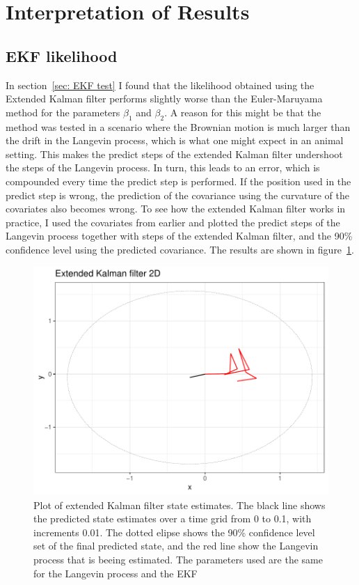 

\section{Interpretation of Results}
\subsection{EKF likelihood}
 In section~\ref{sec: EKF test} I found that the likelihood obtained using the Extended Kalman filter performs slightly worse than the Euler-Maruyama method for the parameters $\beta_1$ and $\beta_2$. A reason for this might be that the method was tested in a scenario where the Brownian motion is much larger than the drift in the Langevin process, which is what one might expect in an animal setting. This makes the predict steps of the extended Kalman filter undershoot the steps of the Langevin process. In turn, this leads to an error, which is compounded every time the predict step is performed. If the position used in the predict step is wrong, the prediction of the covariance using the curvature of the covariates also becomes wrong. To see how the extended Kalman filter works in practice, I used the covariates from earlier and plotted the predict steps of the Langevin process together with steps of the extended Kalman filter, and the 90\% confidence level using the predicted covariance. The results are shown in figure~\ref{fig:EKF high diffusion}. 


\begin{figure}[H]
    \centering
    \includegraphics[width=\linewidth]{Images/discussion/EKF high diffusion path.pdf}
    \caption[Extended Kalman filter path]{Plot of extended Kalman filter state estimates. The black line shows the predicted state estimates over a time grid from 0 to 0.1, with increments 0.01. The dotted elipse shows the 90\% confidence level set of the final predicted state, and the red line show the Langevin process that is beeing estimated. The parameters used are the same for the Langevin process and the EKF}
    \label{fig:EKF high diffusion}
\end{figure}

